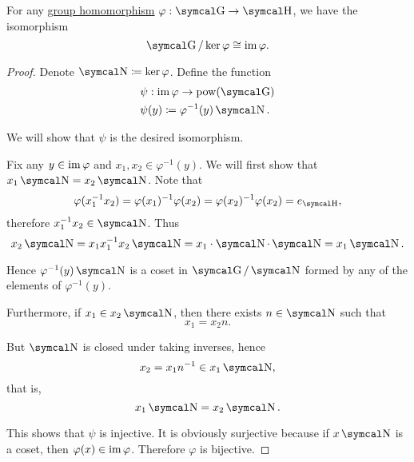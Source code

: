 \begin{theorem}\label{thm:homomorphism_theorem_for_groups}
  For any \hyperref[def:group/homomorphism]{group homomorphism} \( \varphi: \CG \to \CH \), we have the isomorphism
  \begin{equation*}
    \CG / \ker \varphi \cong \Img \varphi.
  \end{equation*}
\end{theorem}
\begin{proof}
  Denote \( \CN \coloneqq \ker \varphi \). Define the function
  \begin{align*}
    &\psi: \Img \varphi \to \Pow(\CG) \\
    &\psi(y) \coloneqq \varphi^{-1}(y) \CN.
  \end{align*}

  We will show that \( \psi \) is the desired isomorphism.

  Fix any \( y \in \operatorname{im} \varphi \) and \( x_1, x_2 \in \varphi^{-1}(y) \). We will first show that \( x_1 \CN = x_2 \CN \). Note that
  \begin{equation*}
    \varphi(x_1^{-1} x_2)
    =
    \varphi(x_1)^{-1} \varphi(x_2)
    =
    \varphi(x_2)^{-1} \varphi(x_2)
    =
    e_{\CH},
  \end{equation*}
  therefore \( x_1^{-1} x_2 \in \CN \). Thus
  \begin{equation*}
    x_2 \CN = x_1 x_1^{-1} x_2 \CN = x_1 \cdot \CN \cdot \CN = x_1 \CN.
  \end{equation*}

  Hence \( \varphi^{-1}(y) \CN \) is a coset in \( \CG / \CN \) formed by any of the elements of \( \varphi^{-1}(y) \).

  Furthermore, if \( x_1 \in x_2 \CN \), then there exists \( n \in \CN \) such that
  \begin{equation*}
    x_1 = x_2 n.
  \end{equation*}

  But \( \CN \) is closed under taking inverses, hence
  \begin{equation*}
    x_2 = x_1 n^{-1} \in x_1 \CN,
  \end{equation*}
  that is,
  \begin{equation*}
    x_1 \CN = x_2 \CN.
  \end{equation*}

  This shows that \( \psi \) is injective. It is obviously surjective because if \( x \CN \) is a coset, then \( \varphi(x) \in \operatorname{im} \varphi \). Therefore \( \varphi \) is bijective.


\end{proof}
